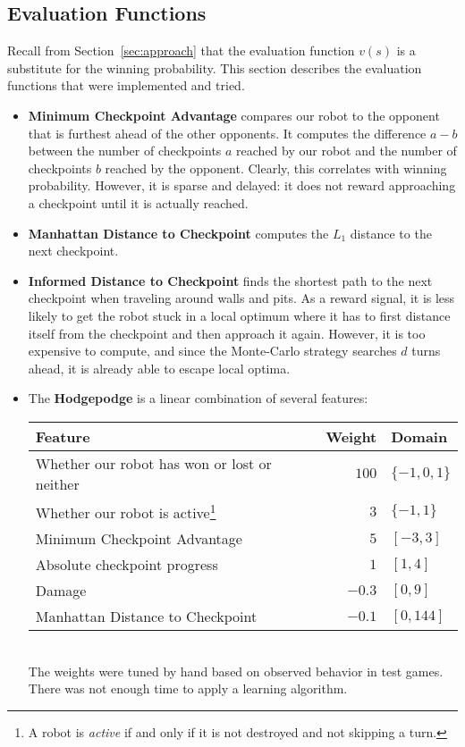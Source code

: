 \documentclass{article}
\newcommand{\state}{s}
\newcommand{\evaluator}{v}
\begin{document}
\subsection{Evaluation Functions} \label{sec:evaluators}

Recall from Section~\ref{sec:approach} that the evaluation function $\evaluator(\state)$ is a substitute for the winning probability.  This section describes the evaluation functions that were implemented and tried.

\begin{itemize}
\item \textbf{Minimum Checkpoint Advantage} compares our robot to the opponent that is furthest ahead of the other opponents.  It computes the difference $a - b$ between the number of checkpoints $a$ reached by our robot and the number of checkpoints $b$ reached by the opponent.  Clearly, this correlates with winning probability.  However, it is sparse and delayed: it does not reward approaching a checkpoint until it is actually reached. \\
\item \textbf{Manhattan Distance to Checkpoint} computes the $L_1$ distance to the next checkpoint. \\
\item \textbf{Informed Distance to Checkpoint} finds the shortest path to the next checkpoint when traveling around walls and pits.  As a reward signal, it is less likely to get the robot stuck in a local optimum where it has to first distance itself from the checkpoint and then approach it again.  However, it is too expensive to compute, and since the Monte-Carlo strategy searches $d$ turns ahead, it is already able to escape local optima. \\
\item The \textbf{Hodgepodge} is a linear combination of several features: \\
  \begin{tabular}{l|r|l}
    Feature & Weight & Domain \\
    \hline
    Whether our robot has won or lost or neither & $100$ & $\{-1,0,1\}$ \\
    Whether our robot is active\footnote{A robot is \emph{active} if and only if it is not destroyed and not skipping a turn.} & $3$ & $\{-1,1\}$ \\
    Minimum Checkpoint Advantage & $5$ & $[-3,3]$ \\
    Absolute checkpoint progress & $1$ & $[1,4]$ \\
    Damage                       & $-0.3$ & $[0,9]$ \\
    Manhattan Distance to Checkpoint & $-0.1$ & $[0,144]$ \\
  \end{tabular} \\
  The weights were tuned by hand based on observed behavior in test games.  There was not enough time to apply a learning algorithm.
\end{itemize}
\end{document}

